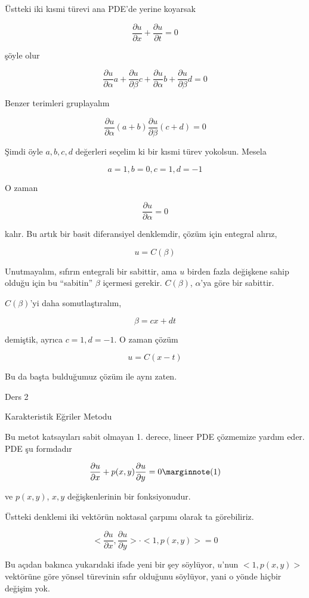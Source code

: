 \documentclass[12pt,fleqn]{article}\usepackage{../../common}
\begin{document}
Üstteki iki kısmi türevi ana PDE'de yerine koyarsak

$$ \frac{\partial u}{\partial x} + \frac{\partial u}{\partial t} = 0$$

şöyle olur

$$ 
\frac{\partial u}{\partial \alpha} a  +
\frac{\partial u}{\partial \beta} c + 
\frac{\partial u}{\partial \alpha} b + 
\frac{\partial u}{\partial \beta} d = 0
$$

Benzer terimleri gruplayalım

$$ 
\frac{\partial u}{\partial \alpha} (a+b)
\frac{\partial u}{\partial \beta} (c+d) = 0
$$

Şimdi öyle $a,b,c,d$ değerleri seçelim ki bir kısmi türev yokolsun. Mesela 

$$ a = 1, b = 0, c=1, d=-1 $$

O zaman 

$$ \frac{\partial u}{\partial \alpha} = 0 $$

kalır. Bu artık bir basit diferansiyel denklemdir, çözüm için entegral
alırız, 

$$ u = C(\beta) $$

Unutmayalım, sıfırın entegrali bir sabittir, ama $u$ birden fazla değişkene
sahip olduğu için bu ``sabitin'' $\beta$ içermesi gerekir. $C(\beta)$,
$\alpha$'ya göre bir sabittir. 

$C(\beta)$'yi daha somutlaştıralım, 

$$ \beta = cx + dt $$
 
demiştik, ayrıca $c=1,d=-1$. O zaman çözüm

$$ u = C(x-t) $$

Bu da başta bulduğumuz çözüm ile aynı zaten. 

Ders 2

Karakteristik Eğriler Metodu

Bu metot katsayıları sabit olmayan 1. derece, lineer PDE çözmemize yardım
eder. PDE şu formdadır

$$ \frac{\partial u}{\partial x} + 
p(x,y) \frac{\partial u}{\partial y} = 0 
\mlabel{1}
 $$

ve $p(x,y)$, $x,y$ değişkenlerinin bir fonksiyonudur. 

Üstteki denklemi iki vektörün noktasal çarpımı olarak ta görebiliriz. 

$$ 
<\frac{\partial u}{\partial x}, \frac{\partial u}{\partial y}> \cdot 
<1,p(x,y)> = 0
 $$

Bu açıdan bakınca yukarıdaki ifade yeni bir şey söylüyor, $u$'nun
$<1,p(x,y)>$ vektörüne göre yönsel türevinin sıfır olduğunu söylüyor, yani
o yönde hiçbir değişim yok. 
\end{document}

